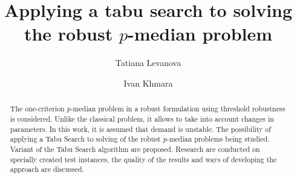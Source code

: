 \begin{englishtitle} %
\title{Applying a tabu search to solving the robust $p$-median problem}
\author{Tatiana Levanova  \and   Ivan Khmara
 }


\maketitle

\begin{abstract}
The one-criterion  $p$-median problem in a robust formulation using threshold robustness is considered. Unlike the classical problem, it allows to take into account changes in parameters. In this work, it is assumed that demand is unstable. The possibility of applying a Tabu Search  to solving of the robust $p$-median problems being studied. Variant of the Tabu Search algorithm  are proposed. Research are conducted on specially created test instances, the quality of the results and ways of developing the approach are discussed.

\end{abstract}
\end{englishtitle}

\iffalse
%
%


\documentclass[12pt]{llncs}  


\usepackage{iftex}

\ifPDFTeX
\usepackage[T2A]{fontenc}
\usepackage[utf8]{inputenc} %
\usepackage[english,russian]{babel}
\fi

\usepackage{todonotes} 

